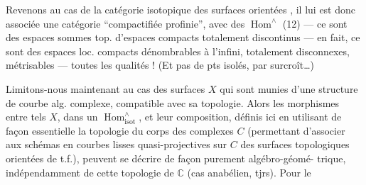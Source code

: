 Revenons au cas de la catégorie isotopique
des surfaces orientées  , il lui est donc
associée une catégorie ``compactifiée profinie'',
avec des $\operatorname{Hom}^{\wedge}$  (12) --- ce sont
des espaces sommes top. d'espaces compacts
totalement discontinus --- en fait, ce sont
des espaces loc. compacts dénombrables à l'infini,
totalement disconnexes, métrisables --- toutes
les qualités ! (Et pas de pts isolés, par
surcroît\ldots)

Limitons-nous maintenant au cas des
surfaces $X$ qui sont munies d'une structure
de courbe alg. complexe, compatible avec sa
topologie. Alors les morphismes entre tels
$X$, dans un $\operatorname{Hom}^{\wedge}_{\mathrm{isot}}$, et leur composition,
définis ici en utilisant de façon essentielle
la topologie du corps des complexes $C$
(permettant d'associer aux schémas en courbes
lisses quasi-projectives sur $C$ des surfaces
topologiques orientées de t.f.), peuvent se
décrire de façon purement algébro-géomé-
trique, indépendamment de cette topologie
de $\mathbb C$ (cas anabélien, tjrs). Pour le
